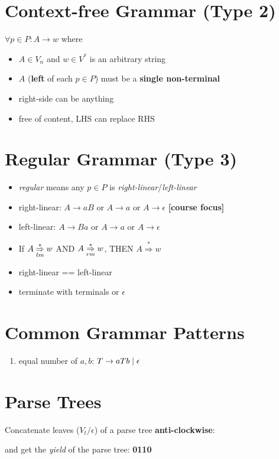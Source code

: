 \documentclass[10pt,a4paper,landscape]{article}
\begin{document}
\begin{multicols*}{3}
\section*{Context-free Grammar (Type 2)}
\(\forall p \in P: A \rightarrow w\) where
\begin{itemize}
\item \(A \in V_{n}\) and \(w \in V^{*}\) is an arbitrary string
\item \(A\) (\textbf{left} of each \(p \in P\)) must be a \textbf{single non-terminal}
\item right-side can be anything
\item free of content, LHS can replace RHS
\end{itemize}
\section*{Regular Grammar (Type 3)}
\begin{itemize}
\item \emph{regular} means any \(p \in P\) is \emph{right-linear}/\emph{left-linear}
\item right-linear: \(A \rightarrow aB\) or \(A \rightarrow a\) or \(A \rightarrow \epsilon\) \textbf{[course focus]}
\item left-linear: \(A \rightarrow Ba\) or \(A \rightarrow a\) or \(A \rightarrow \epsilon\)
\item If \(A \overset{*}{\underset{lm}{\Rightarrow}} w\) AND \(A \overset{*}{\underset{rm}{\Rightarrow}} w\), THEN \(A \overset{*}{\Rightarrow} w\)
\item right-linear == left-linear
\item terminate with terminals or \(\epsilon\)
\end{itemize}
\section*{Common Grammar Patterns}
\begin{enumerate}
\item equal number of \(a, b\): \(T \rightarrow aTb \;|\; \epsilon\)
\end{enumerate}
\section*{Parse Trees}
Concatenate leaves (\(V_{t}/\epsilon\)) of a parse tree \textbf{anti-clockwise}:
and get the \emph{yield} of the parse tree: \textbf{0110}

\end{multicols*}
\end{document}
